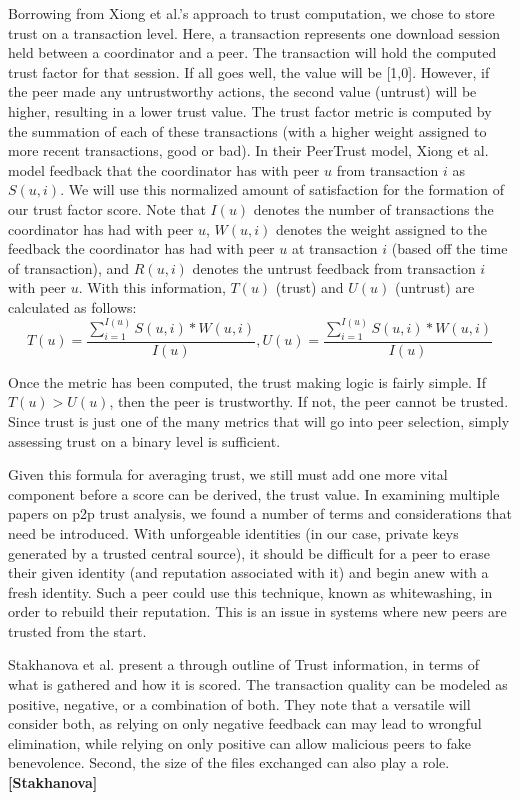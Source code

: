 \documentclass[12pt]{article}
\newcommand{\lcite}[1]
{{\bfseries\color{orange}[#1]}}
\begin{document}
			Borrowing from Xiong et al.'s approach to trust computation, we chose to store trust on a transaction level. Here, a transaction represents one download session held between a coordinator and a peer. The transaction will hold the computed trust factor for that session. If all goes well, the value will be [1,0]. However, if the peer made any untrustworthy actions, the second value (untrust) will be higher, resulting in a lower trust value. The trust factor metric is computed by the summation of each of these transactions (with a higher weight assigned to more recent transactions, good or bad). In their PeerTrust model, Xiong et al. model feedback that the coordinator has with peer $u$ from transaction $i$ as $S(u,i)$. We will use this normalized amount of satisfaction for the formation of our trust factor score. Note that $I(u)$ denotes the number of transactions the coordinator has had with peer $u$, $W(u,i)$ denotes the weight assigned to the feedback the coordinator has had with peer $u$ at transaction $i$ (based off the time of transaction), and $R(u,i)$ denotes the untrust feedback from transaction $i$ with peer $u$. With this information, $T(u)$ (trust) and $U(u)$ (untrust) are calculated as follows:
			$$
				T(u) = \frac{\sum\limits_{i=1}^{I(u)} S(u,i) * W(u,i)}{I(u)},
				U(u) = \frac{\sum\limits_{i=1}^{I(u)} S(u,i) * W(u,i)}{I(u)}
			$$

			Once the metric has been computed, the trust making logic is fairly simple. If $T(u) > U(u)$, then the peer is trustworthy. If not, the peer cannot be trusted. Since trust is just one of the many metrics that will go into peer selection, simply assessing trust on a binary level is sufficient. 

			Given this formula for averaging trust, we still must add one more vital component before a score can be derived, the trust value. In examining multiple papers on p2p trust analysis, we found a number of terms and considerations that need be introduced. With unforgeable identities (in our case, private keys generated by a trusted central source), it should be difficult for a peer to erase their given identity (and reputation associated with it) and begin anew with a fresh identity. Such a peer could use this technique, known as whitewashing, in order to rebuild their reputation. This is an issue in systems where new peers are trusted from the start.

			Stakhanova et al. present a through outline of Trust information, in terms of what is gathered and how it is scored. The transaction quality can be modeled as positive, negative, or a combination of both. They note that a versatile will consider both, as relying on only negative feedback can may lead to wrongful elimination, while relying on only positive can allow malicious peers to fake benevolence. Second, the size of the files exchanged can also play a role.\lcite{Stakhanova}
\end{document}
